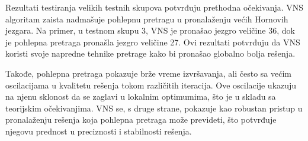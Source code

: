 \documentclass[12pt,oneside]{memoir}
\begin{document}
\renewcommand{\arraystretch}{2} %
\begin{table}[H]
\centering
{}
\caption{Rezultati na tri velika testna skupa}
\label{tab:test_results}
\end{table}



Rezultati testiranja velikih testnih skupova potvrđuju prethodna očekivanja. VNS algoritam zaista nadmašuje pohlepnu pretragu u pronalaženju većih Hornovih jezgara. Na primer, u testnom skupu 3, VNS je pronašao jezgro veličine 36, dok je pohlepna pretraga pronašla jezgro veličine 27. Ovi rezultati potvrđuju da VNS koristi svoje napredne tehnike pretrage kako bi pronašao globalno bolja rešenja.

Takođe, pohlepna pretraga pokazuje brže vreme izvršavanja, ali često sa većim oscilacijama u kvalitetu rešenja tokom različitih iteracija. Ove oscilacije ukazuju na njenu sklonost da se zaglavi u lokalnim optimumima, što je u skladu sa teorijskim očekivanjima. VNS se, s druge strane, pokazuje kao robustan pristup u pronalaženju rešenja koja pohlepna pretraga može prevideti, što potvrđuje njegovu prednost u preciznosti i stabilnosti rešenja.
\end{document}
